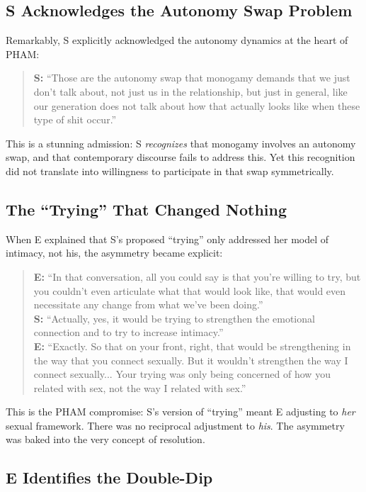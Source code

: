 \documentclass[12pt,openany]{book}
\numberwithin{equation}{chapter}
\begin{document}
\subsection{S Acknowledges the Autonomy Swap Problem}

Remarkably, S explicitly acknowledged the autonomy dynamics at the heart of PHAM:

\begin{quote}
\textbf{S:} ``Those are the autonomy swap that monogamy demands that we just don't talk about, not just us in the relationship, but just in general, like our generation does not talk about how that actually looks like when these type of shit occur.''
\end{quote}

This is a stunning admission: S \textit{recognizes} that monogamy involves an autonomy swap, and that contemporary discourse fails to address this. Yet this recognition did not translate into willingness to participate in that swap symmetrically.

\subsection{The ``Trying'' That Changed Nothing}

When E explained that S's proposed ``trying'' only addressed her model of intimacy, not his, the asymmetry became explicit:

\begin{quote}
\textbf{E:} ``In that conversation, all you could say is that you're willing to try, but you couldn't even articulate what that would look like, that would even necessitate any change from what we've been doing.''\\[0.5em]
\textbf{S:} ``Actually, yes, it would be trying to strengthen the emotional connection and to try to increase intimacy.''\\[0.5em]
\textbf{E:} ``Exactly. So that on your front, right, that would be strengthening in the way that you connect sexually. But it wouldn't strengthen the way I connect sexually... Your trying was only being concerned of how you related with sex, not the way I related with sex.''
\end{quote}

This is the PHAM compromise: S's version of ``trying'' meant E adjusting to \textit{her} sexual framework. There was no reciprocal adjustment to \textit{his}. The asymmetry was baked into the very concept of resolution.

\subsection{E Identifies the Double-Dip}
\end{document}

